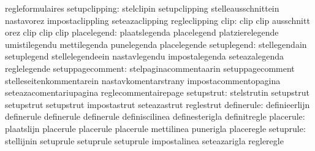                                   regleformulaires
                   setupclipping: stelclipin                       setupclipping
                                  stelleausschnittein              nastavorez
                                  impostaclippling                 seteazaclipping
                                  regleclipping
                            clip: clip                             clip
                                  ausschnitt                       orez
                                  clip                             clip
                                  clip
                     placelegend: plaatslegenda                    placelegend
                                  platzierelegende                 umistilegendu
                                  mettilegenda                     punelegenda
                                  placelegende
                     setuplegend: stellegendain                    setuplegend
                                  stellelegendeein                 nastavlegendu
                                  impostalegenda                   seteazalegenda
                                  reglelegende
                setuppagecomment: stelpaginacommentaarin           setuppagecomment
                                  stelleseitenkommentarein         nastavkomentarstrany
                                  impostacommentopagina            seteazacomentariupagina
                                  reglecommentairepage
                      setupstrut: stelstrutin                      setupstrut
                                  setupstrut                       setupstrut
                                  impostastrut                     seteazastrut
                                  reglestrut
                      definerule: definieerlijn                    definerule
                                  definerule                       definerule
                                  definiscilinea                   definesterigla
                                  definitregle
                       placerule: plaatslijn                       placerule
                                  placerule                        placerule
                                  mettilinea                       punerigla
                                  placeregle
                       setuprule: stellijnin                       setuprule
                                  setuprule                        setuprule
                                  impostalinea                     seteazarigla
                                  regleregle
